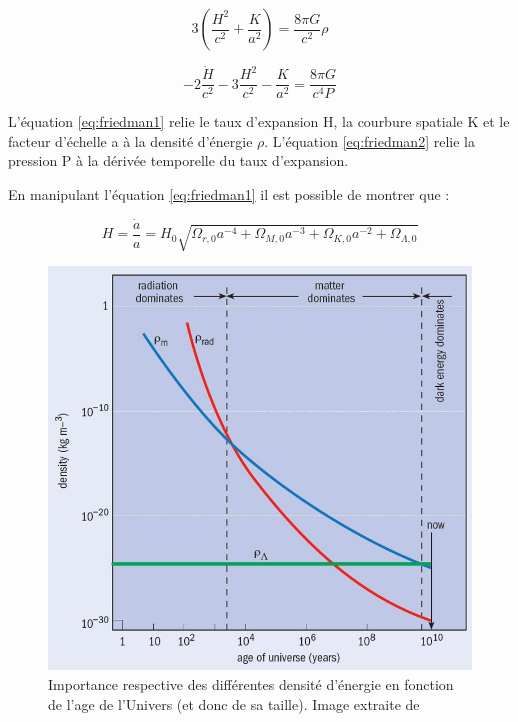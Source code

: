 
\begin{equation}
3 \left( \frac{H^2}{c^2} +\frac{K}{a^2} \right) = \frac{8 \pi G }{c^2} \rho
\label{eq:friedman1}
\end{equation}

\begin{equation}
-2 \frac{ \dot{H}}{c^2} -3 \frac{H^2}{c^2} -\frac{K}{a^2} = \frac{8 \pi G }{c^4 P}
\label{eq:friedman2}
\end{equation}

L'équation \ref{eq:friedman1} relie le taux d'expansion H, la courbure spatiale K et le facteur d'échelle a à la densité d'énergie $\rho$.
L'équation \ref{eq:friedman2} relie la pression P à la dérivée temporelle du taux d'expansion.
 
  
En manipulant l'équation \ref{eq:friedman1} il est possible de montrer que :


\begin{equation}
H = \frac{\dot{a}}{a} = H_0 \sqrt{ \Omega_{r,0} a^{-4} +  \Omega_{M,0} a^{-3} + \Omega_{K,0}a^{-2} + \Omega_{\Lambda,0}  } 
\label{eq:scale_t}
\end{equation}


\begin{figure}
        \includegraphics[width=.9\linewidth]{img/01/dark4.jpg} 
        \caption[Densités d'énergies]{Importance respective des différentes densité d'énergie en fonction de l'age de l'Univers (et donc de sa taille). Image extraite de \citep{2005univ.book.....F}
 		\label{fig:cosmoparamt} }
\end{figure}


